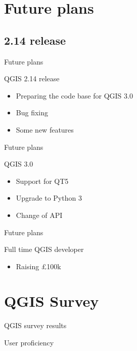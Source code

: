 \section{Future plans}
\subsection{2.14 release}

\begin{frame}{Future plans}
	\begin{block}{QGIS 2.14 release}
		\begin{itemize}
			\item Preparing the code base for QGIS 3.0
			\item Bug fixing 
			\item Some new features
		\end{itemize}
	\end{block}
\end{frame}

\begin{frame}{Future plans}
	\begin{block}{QGIS 3.0}
		\begin{itemize}
			\item Support for QT5
			\item Upgrade to Python 3
			\item Change of API
		\end{itemize}
	\end{block}
\end{frame}

\begin{frame}{Future plans}
	\begin{block}{Full time QGIS developer}
		\begin{itemize}
			\item Raising \pounds100k
		\end{itemize}
	\end{block}
\end{frame}

\section{QGIS Survey}

\begin{frame}{QGIS survey results}
	\begin{block}{User proficiency}
	\end{block}
\end{frame}

